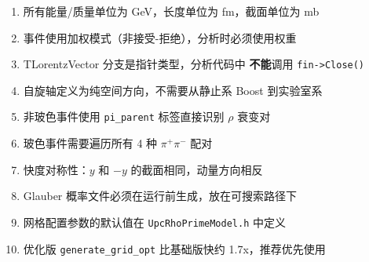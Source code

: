 \documentclass[11pt,a4paper,UTF8]{ctexart}
\begin{document}
\begin{enumerate}[leftmargin=2em]
    \item 所有能量/质量单位为 GeV，长度单位为 fm，截面单位为 mb
    \item 事件使用加权模式（非接受-拒绝），分析时必须使用权重
    \item TLorentzVector 分支是指针类型，分析代码中 \textbf{不能}调用 \texttt{fin->Close()}
    \item 自旋轴定义为纯空间方向，不需要从静止系 Boost 到实验室系
    \item 非玻色事件使用 \texttt{pi\_parent} 标签直接识别 $\rho$ 衰变对
    \item 玻色事件需要遍历所有 4 种 $\pi^+\pi^-$ 配对
    \item 快度对称性：$y$ 和 $-y$ 的截面相同，动量方向相反
    \item Glauber 概率文件必须在运行前生成，放在可搜索路径下
    \item 网格配置参数的默认值在 \texttt{UpcRhoPrimeModel.h} 中定义
    \item 优化版 \texttt{generate\_grid\_opt} 比基础版快约 1.7x，推荐优先使用
\end{enumerate}
\end{document}
